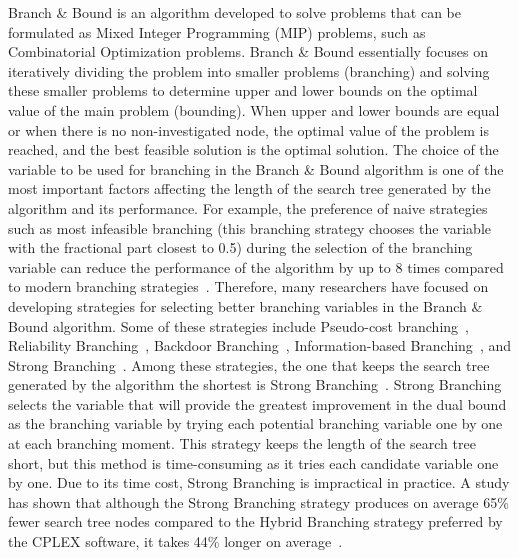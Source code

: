 Branch \& Bound is an algorithm developed to solve problems that can be formulated as Mixed Integer Programming (MIP) problems, such as Combinatorial Optimization problems.
Branch \& Bound essentially focuses on iteratively dividing the problem into smaller problems (branching) and solving these smaller problems to determine upper and lower bounds on the optimal value of the main problem (bounding).
When upper and lower bounds are equal or when there is no non-investigated node, the optimal value of the problem is reached, and the best feasible solution is the optimal solution.
The choice of the variable to be used for branching in the Branch \& Bound algorithm is one of the most important factors affecting the length of the search tree generated by the algorithm and its performance.
For example, the preference of naive strategies such as most infeasible branching (this branching strategy chooses the variable with the fractional part closest to 0.5) during the selection of the branching variable can reduce the performance of the algorithm by up to 8 times compared to modern branching strategies~\cite{achterberg_mixed_2013}.
Therefore, many researchers have focused on developing strategies for selecting better branching variables in the Branch \& Bound algorithm.
Some of these strategies include Pseudo-cost branching~\cite{benichou_experiments_1971}, Reliability Branching~\cite{achterbergBranchingRulesRevisited2005}, Backdoor Branching~\cite{fischettiBackdoorBranching2011}, Information-based Branching~\cite{kilinckarzanInformationbasedBranchingSchemes2009}, and Strong Branching~\cite{applegateFindingCutsTSP1995}.
Among these strategies, the one that keeps the search tree generated by the algorithm the shortest is Strong Branching~\cite{applegateFindingCutsTSP1995}.
Strong Branching selects the variable that will provide the greatest improvement in the dual bound as the branching variable by trying each potential branching variable one by one at each branching moment.
This strategy keeps the length of the search tree short, but this method is time-consuming as it tries each candidate variable one by one.
Due to its time cost, Strong Branching is impractical in practice.
A study has shown that although the Strong Branching strategy produces on average 65\% fewer search tree nodes compared to the Hybrid Branching strategy preferred by the CPLEX software, it takes 44\% longer on average~\cite{DBLP:phd/de/Achterberg2007}.

